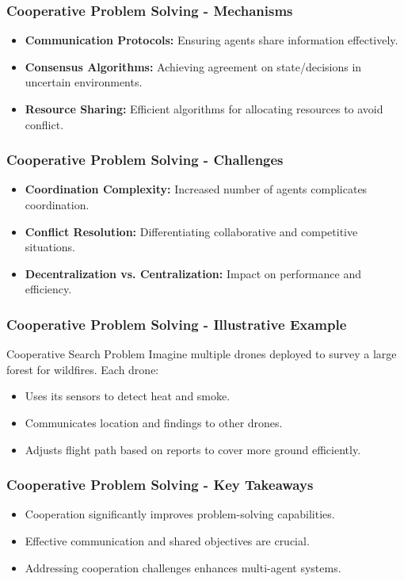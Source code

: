 \documentclass[aspectratio=169]{beamer}
\begin{document}
\begin{frame}[fragile]
    \frametitle{Cooperative Problem Solving - Mechanisms}
    \begin{itemize}
        \item \textbf{Communication Protocols:} Ensuring agents share information effectively.
        \item \textbf{Consensus Algorithms:} Achieving agreement on state/decisions in uncertain environments.
        \item \textbf{Resource Sharing:} Efficient algorithms for allocating resources to avoid conflict.
    \end{itemize}
\end{frame}

\begin{frame}[fragile]
    \frametitle{Cooperative Problem Solving - Challenges}
    \begin{itemize}
        \item \textbf{Coordination Complexity:} Increased number of agents complicates coordination.
        \item \textbf{Conflict Resolution:} Differentiating collaborative and competitive situations.
        \item \textbf{Decentralization vs. Centralization:} Impact on performance and efficiency.
    \end{itemize}
\end{frame}

\begin{frame}[fragile]
    \frametitle{Cooperative Problem Solving - Illustrative Example}
    \begin{block}{Cooperative Search Problem}
        Imagine multiple drones deployed to survey a large forest for wildfires. Each drone:
        \begin{itemize}
            \item Uses its sensors to detect heat and smoke.
            \item Communicates location and findings to other drones.
            \item Adjusts flight path based on reports to cover more ground efficiently.
        \end{itemize}
    \end{block}
\end{frame}

\begin{frame}[fragile]
    \frametitle{Cooperative Problem Solving - Key Takeaways}
    \begin{itemize}
        \item Cooperation significantly improves problem-solving capabilities.
        \item Effective communication and shared objectives are crucial.
        \item Addressing cooperation challenges enhances multi-agent systems.
    \end{itemize}
\end{frame}
\end{document}
